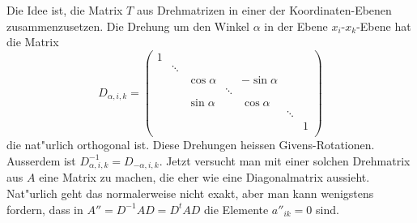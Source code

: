 Die Idee ist, die Matrix $T$ aus Drehmatrizen in einer der Koordinaten-Ebenen
zusammenzusetzen.
Die Drehung um den Winkel $\alpha$ in der Ebene
$x_i$-$x_k$-Ebene hat die Matrix
\begin{equation}
D_{\alpha,i,k}=\begin{pmatrix}
1     &      &           &      &           &      &      \\
      &\ddots&           &      &           &      &      \\
      &      & \cos\alpha&      &-\sin\alpha&      &      \\
      &      &           &\ddots&           &      &      \\
      &      & \sin\alpha&      & \cos\alpha&      &      \\
      &      &           &      &           &\ddots&      \\
      &      &           &      &           &      &1     \\
\end{pmatrix}
\label{matrixd}
\end{equation}
die nat"urlich orthogonal ist.
Diese Drehungen heissen Givens-Rotationen.
Ausserdem ist
$D_{\alpha,i,k}^{-1}=D_{-\alpha,i,k}$.
Jetzt versucht man mit
einer solchen Drehmatrix aus $A$ eine Matrix zu machen, die 
eher wie eine Diagonalmatrix aussieht.
Nat"urlich geht das
normalerweise nicht exakt, aber man kann wenigstens fordern,
dass in $A''= D^{-1}AD=D^tAD$ die Elemente $a''_{ik}=0$ sind.


